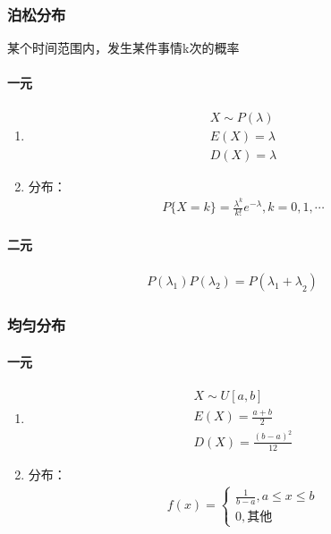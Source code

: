 \documentclass[12pt]{book}
\begin{document}
\subsubsection{泊松分布}


某个时间范围内，发生某件事情k次的概率

\paragraph{一元}

\begin{enumerate}[1.]
    \item \begin{gather*}
              X\sim P(\lambda) \\
              E(X)=\lambda \\
              D(X)=\lambda
          \end{gather*}
    \item 分布：
          \begin{gather*}
              P\{X=k\}=\frac{\lambda^k}{k!} e^{-\lambda}, k=0,1,\cdots
          \end{gather*}
\end{enumerate}




\paragraph{二元}

\begin{gather*}
P(\lambda_1)P(\lambda_2) 
= P({\lambda_1+\lambda}_2)
\end{gather*}




\subsubsection{均匀分布}


\paragraph{一元} 


\begin{enumerate}[1.]
    \item \begin{gather*}
              X\sim U[a,b] \\
              E(X)=\frac{a+b}{2} \\
              D(X)=\frac{(b-a)^2}{12}
          \end{gather*}
    \item 分布：
          \begin{gather*}
              f(x) = \begin{cases}
                  \frac{1}{b-a}, a\leqslant x\leqslant b \\
                  0, \text{其他}
              \end{cases}
          \end{gather*}
\end{enumerate}
\end{document}
